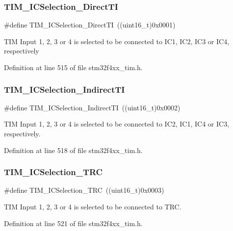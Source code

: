 \subsubsection{\texorpdfstring{T\+I\+M\+\_\+\+I\+C\+Selection\+\_\+\+Direct\+TI}{TIM\_ICSelection\_DirectTI}}
{\footnotesize\ttfamily \#define T\+I\+M\+\_\+\+I\+C\+Selection\+\_\+\+Direct\+TI~((uint16\+\_\+t)0x0001)}

T\+IM Input 1, 2, 3 or 4 is selected to be connected to I\+C1, I\+C2, I\+C3 or I\+C4, respectively 

Definition at line 515 of file stm32f4xx\+\_\+tim.\+h.

\mbox{\label{group___t_i_m___input___capture___selection_ga2289b684133ac0b81ddfcd860d01b144}} 
\subsubsection{\texorpdfstring{T\+I\+M\+\_\+\+I\+C\+Selection\+\_\+\+Indirect\+TI}{TIM\_ICSelection\_IndirectTI}}
{\footnotesize\ttfamily \#define T\+I\+M\+\_\+\+I\+C\+Selection\+\_\+\+Indirect\+TI~((uint16\+\_\+t)0x0002)}

T\+IM Input 1, 2, 3 or 4 is selected to be connected to I\+C2, I\+C1, I\+C4 or I\+C3, respectively. 

Definition at line 518 of file stm32f4xx\+\_\+tim.\+h.

\mbox{\label{group___t_i_m___input___capture___selection_ga2cd464e97ffd6ea3208ec65672f9a373}} 
\subsubsection{\texorpdfstring{T\+I\+M\+\_\+\+I\+C\+Selection\+\_\+\+T\+RC}{TIM\_ICSelection\_TRC}}
{\footnotesize\ttfamily \#define T\+I\+M\+\_\+\+I\+C\+Selection\+\_\+\+T\+RC~((uint16\+\_\+t)0x0003)}

T\+IM Input 1, 2, 3 or 4 is selected to be connected to T\+RC. 

Definition at line 521 of file stm32f4xx\+\_\+tim.\+h.

